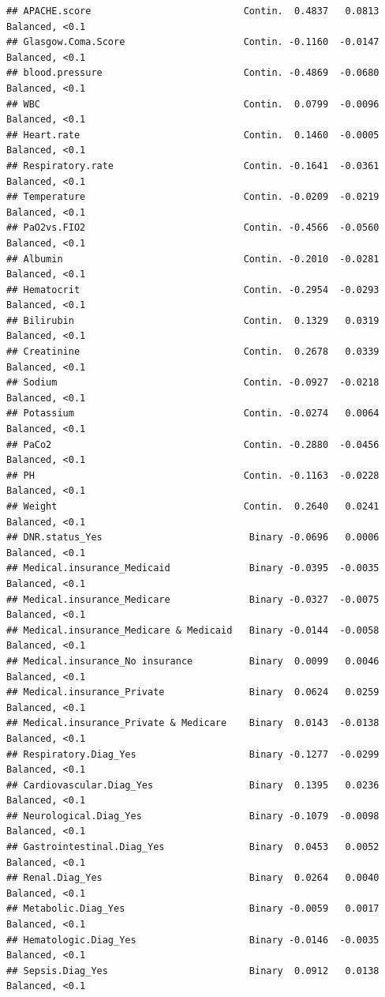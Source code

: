 \documentclass[
]{book}
\begin{document}
\begin{verbatim}
## APACHE.score                           Contin.  0.4837   0.0813 Balanced, <0.1
## Glasgow.Coma.Score                     Contin. -0.1160  -0.0147 Balanced, <0.1
## blood.pressure                         Contin. -0.4869  -0.0680 Balanced, <0.1
## WBC                                    Contin.  0.0799  -0.0096 Balanced, <0.1
## Heart.rate                             Contin.  0.1460  -0.0005 Balanced, <0.1
## Respiratory.rate                       Contin. -0.1641  -0.0361 Balanced, <0.1
## Temperature                            Contin. -0.0209  -0.0219 Balanced, <0.1
## PaO2vs.FIO2                            Contin. -0.4566  -0.0560 Balanced, <0.1
## Albumin                                Contin. -0.2010  -0.0281 Balanced, <0.1
## Hematocrit                             Contin. -0.2954  -0.0293 Balanced, <0.1
## Bilirubin                              Contin.  0.1329   0.0319 Balanced, <0.1
## Creatinine                             Contin.  0.2678   0.0339 Balanced, <0.1
## Sodium                                 Contin. -0.0927  -0.0218 Balanced, <0.1
## Potassium                              Contin. -0.0274   0.0064 Balanced, <0.1
## PaCo2                                  Contin. -0.2880  -0.0456 Balanced, <0.1
## PH                                     Contin. -0.1163  -0.0228 Balanced, <0.1
## Weight                                 Contin.  0.2640   0.0241 Balanced, <0.1
## DNR.status_Yes                          Binary -0.0696   0.0006 Balanced, <0.1
## Medical.insurance_Medicaid              Binary -0.0395  -0.0035 Balanced, <0.1
## Medical.insurance_Medicare              Binary -0.0327  -0.0075 Balanced, <0.1
## Medical.insurance_Medicare & Medicaid   Binary -0.0144  -0.0058 Balanced, <0.1
## Medical.insurance_No insurance          Binary  0.0099   0.0046 Balanced, <0.1
## Medical.insurance_Private               Binary  0.0624   0.0259 Balanced, <0.1
## Medical.insurance_Private & Medicare    Binary  0.0143  -0.0138 Balanced, <0.1
## Respiratory.Diag_Yes                    Binary -0.1277  -0.0299 Balanced, <0.1
## Cardiovascular.Diag_Yes                 Binary  0.1395   0.0236 Balanced, <0.1
## Neurological.Diag_Yes                   Binary -0.1079  -0.0098 Balanced, <0.1
## Gastrointestinal.Diag_Yes               Binary  0.0453   0.0052 Balanced, <0.1
## Renal.Diag_Yes                          Binary  0.0264   0.0040 Balanced, <0.1
## Metabolic.Diag_Yes                      Binary -0.0059   0.0017 Balanced, <0.1
## Hematologic.Diag_Yes                    Binary -0.0146  -0.0035 Balanced, <0.1
## Sepsis.Diag_Yes                         Binary  0.0912   0.0138 Balanced, <0.1

\end{verbatim}
\end{document}
